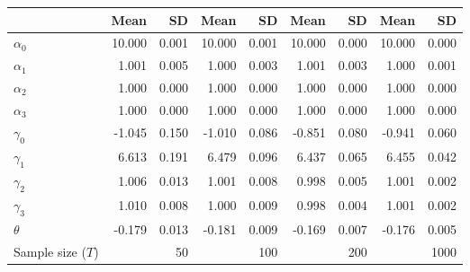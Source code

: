 
\begin{tabular}[t]{lrrrrrrrr}
\toprule
  & Mean & SD & Mean  & SD  & Mean   & SD   & Mean    & SD   \\
\midrule
$\alpha_{0}$ & 10.000 & 0.001 & 10.000 & 0.001 & 10.000 & 0.000 & 10.000 & 0.000\\
$\alpha_{1}$ & 1.001 & 0.005 & 1.000 & 0.003 & 1.001 & 0.003 & 1.000 & 0.001\\
$\alpha_{2}$ & 1.000 & 0.000 & 1.000 & 0.000 & 1.000 & 0.000 & 1.000 & 0.000\\
$\alpha_{3}$ & 1.000 & 0.000 & 1.000 & 0.000 & 1.000 & 0.000 & 1.000 & 0.000\\
$\gamma_{0}$ & -1.045 & 0.150 & -1.010 & 0.086 & -0.851 & 0.080 & -0.941 & 0.060\\
$\gamma_{1}$ & 6.613 & 0.191 & 6.479 & 0.096 & 6.437 & 0.065 & 6.455 & 0.042\\
$\gamma_{2}$ & 1.006 & 0.013 & 1.001 & 0.008 & 0.998 & 0.005 & 1.001 & 0.002\\
$\gamma_{3}$ & 1.010 & 0.008 & 1.000 & 0.009 & 0.998 & 0.004 & 1.001 & 0.002\\
$\theta$ & -0.179 & 0.013 & -0.181 & 0.009 & -0.169 & 0.007 & -0.176 & 0.005\\
Sample size ($T$) &  & 50 &  & 100 &  & 200 &  & 1000\\
\bottomrule
\end{tabular}
